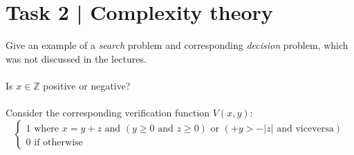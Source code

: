 \documentclass{article}
\begin{document}
\section*{Task 2 | Complexity theory}
Give an example of a \textit{search} problem and corresponding \textit{decision} problem,
which was not discussed in the lectures. \\\\
Is $x \in \mathbb{Z}$ positive or negative? \\\\
Consider the corresponding verification function $V(x,y)$:
$$\begin{cases}
    1 \text{  where } x = y + z \text{ and } (y \ge 0 \text{ and }z \ge 0) \text{ or } (+y > -|z| \text{ and viceversa}) \\
    0 \text{  if otherwise}
\end{cases}$$
\end{document}
